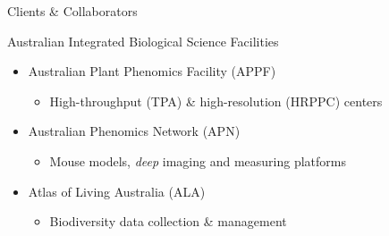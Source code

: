 \documentclass[ignorenonframetext,compress]{beamer}
\begin{document}
\begin{frame}{Clients \& Collaborators}
\begin{block}{Australian Integrated Biological Science Facilities}
    \begin{itemize}
        \item<2-> Australian Plant Phenomics Facility (APPF)
            \begin{itemize}
                \item High-throughput (TPA) \& high-resolution (HRPPC) centers
            \end{itemize}
        \item<3-> Australian Phenomics Network (APN)
            \begin{itemize}
                \item Mouse models, \emph{deep} imaging and measuring platforms
            \end{itemize}
        \item<4-> Atlas of Living Australia (ALA)
            \begin{itemize}
                \item Biodiversity data collection \& management
            \end{itemize}
    \end{itemize}
\end{block}
~\\
\begin{figure}[ht]
\centering
{}
\end{figure}
\end{frame}
\end{document}
